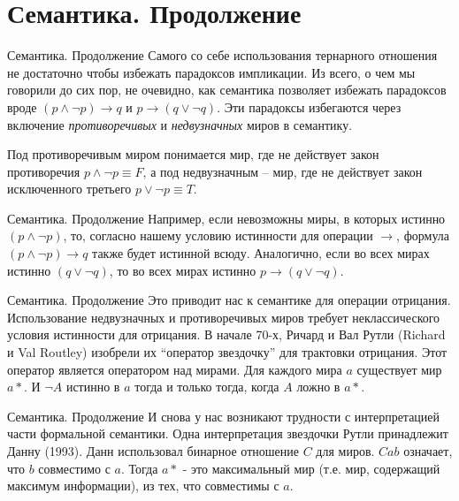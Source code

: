 \documentclass[14pt]{beamer}
\begin{document}
\section{Семантика. Продолжение}

\begin{frame}[nologo]{Семантика. Продолжение}
Самого со себе использования тернарного отношения не достаточно чтобы избежать 
парадоксов импликации. Из всего, о чем мы говорили до сих пор, не очевидно, как 
семантика позволяет избежать парадоксов вроде $ (p \wedge \neg p) \rightarrow q 
$ и $ p \rightarrow (q \vee \neg q) $. Эти парадоксы избегаются через включение 
\emph{противоречивых} и \emph{недвузначных} миров в семантику.

Под противоречивым миром понимается мир, где не действует закон противоречия $ 
p \wedge \neg p \equiv F $, а под недвузначным -- мир, где не действует 
закон исключенного третьего $ p \vee \neg p \equiv T $.
\end{frame}

\begin{frame}[nologo]{Семантика. Продолжение}
Например, если невозможны миры, в которых истинно $ (p \wedge \neg p) $, то, 
согласно нашему условию истинности для операции $\rightarrow$, формула $(p 
\wedge \neg p) \rightarrow q$ также будет истинной всюду. Аналогично, если во 
всех мирах истинно $(q \vee \neg q)$, то во всех мирах истинно $ p \rightarrow 
(q \vee \neg q)$.
\end{frame}

\begin{frame}[nologo]{Семантика. Продолжение}
Это приводит нас к семантике для операции отрицания. Использование недвузначных 
и противоречивых миров требует неклассического условия истинности для 
отрицания. В начале 70-х, Ричард и Вал Рутли (Richard и Val Routley) изобрели 
их ``оператор звездочку'' для трактовки отрицания. Этот оператор является 
оператором над мирами. Для каждого мира $a$ существует мир $a*$. И $\neg A$ 
истинно в $a$ тогда и только тогда, когда $A$ ложно в $a*$.
\end{frame}

\begin{frame}[nologo]{Семантика. Продолжение}
И снова у нас возникают трудности с интерпретацией части формальной семантики. 
Одна интерпретация звездочки Рутли принадлежит Данну (1993). Данн использовал 
бинарное отношение $C$ для миров. $Cab$ означает, что $b$ совместимо с $a$. 
Тогда $a*$ - это максимальный мир (т.е. мир, содержащий максимум информации), 
из тех, что совместимы с $a$.
\end{frame}
\end{document}
